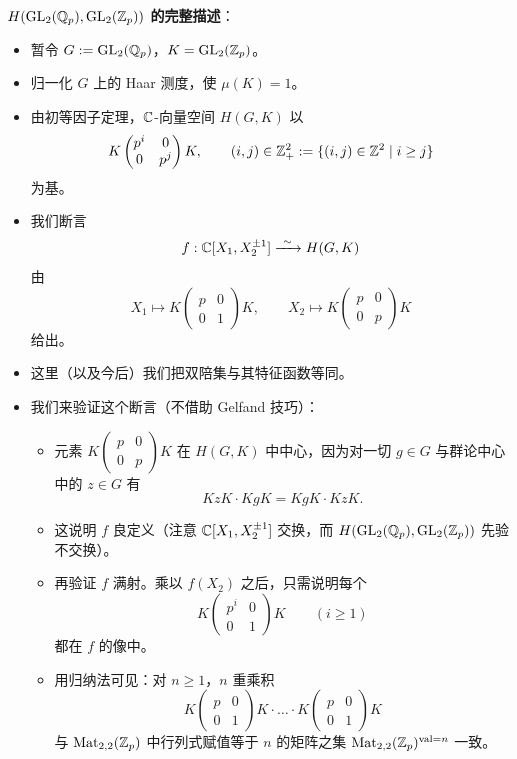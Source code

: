 \textbf{$H(\operatorname{GL}_2(\mathbb{Q}_p),\operatorname{GL}_2(\mathbb{Z}_p))$ 的完整描述}：
\begin{itemize}
\item 暂令 $G:=\operatorname{GL}_2(\mathbb{Q}_p)$，$K=\operatorname{GL}_2(\mathbb{Z}_p)$。
\item 归一化 $G$ 上的 Haar 测度，使 $\mu(K)=1$。
\item 由初等因子定理，$\mathbb{C}$-向量空间 $H(G,K)$ 以
\[
K\begin{pmatrix}p^i&0\\0&p^j\end{pmatrix}K,\qquad
(i,j)\in\mathbb{Z}^2_+:=\{(i,j)\in\mathbb{Z}^2\mid i\ge j\}
\]
为基。
\item 我们断言
\[
f:\C[X_1,X_2^{\pm1}]\xrightarrow{\ \sim\ }H(G,K)
\]
由
\[
X_1\mapsto K\begin{pmatrix}p&0\\0&1\end{pmatrix}K,\qquad
X_2\mapsto K\begin{pmatrix}p&0\\0&p\end{pmatrix}K
\]
给出。
\item 这里（以及今后）我们把双陪集与其特征函数等同。
\item 我们来验证这个断言（不借助 Gelfand 技巧）：
\begin{itemize}
\item 元素 $K\begin{pmatrix}p&0\\0&p\end{pmatrix}K$ 在 $H(G,K)$ 中中心，因为对一切 $g\in G$ 与群论中心中的 $z\in G$ 有
\[
KzK\cdot KgK=KgK\cdot KzK.
\]
\item 这说明 $f$ 良定义（注意 $\mathbb{C}[X_1,X_2^{\pm1}]$ 交换，而 $H(\operatorname{GL}_2(\mathbb{Q}_p),\operatorname{GL}_2(\mathbb{Z}_p))$ 先验不交换）。
\item 再验证 $f$ 满射。乘以 $f(X_2)$ 之后，只需说明每个
\[
K\begin{pmatrix}p^i&0\\0&1\end{pmatrix}K\qquad(i\ge1)
\]
都在 $f$ 的像中。
\item 用归纳法可见：对 $n\ge1$，$n$ 重乘积
\[
K\begin{pmatrix}p&0\\0&1\end{pmatrix}K\cdot\ldots\cdot
K\begin{pmatrix}p&0\\0&1\end{pmatrix}K
\]
与 $\mathrm{Mat}_{2,2}(\mathbb{Z}_p)$ 中行列式赋值等于 $n$ 的矩阵之集 $\mathrm{Mat}_{2,2}(\mathbb{Z}_p)^{\mathrm{val}=n}$ 一致。

\end{itemize}
\end{itemize}
